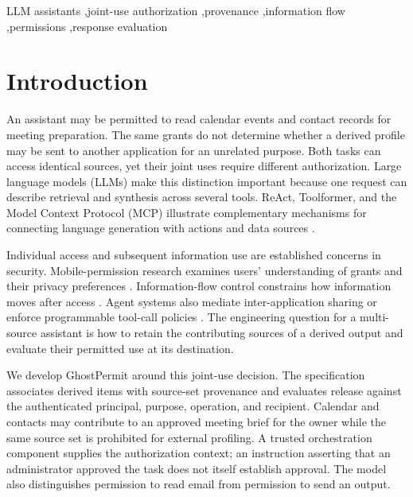 \begin{keywords}
LLM assistants \sep joint-use authorization \sep provenance \sep information flow \sep permissions \sep response evaluation
\end{keywords}

\maketitle
\section{Introduction}\label{sec:intro}

An assistant may be permitted to read calendar events and contact records for meeting preparation. The same grants do not determine whether a derived profile may be sent to another application for an unrelated purpose. Both tasks can access identical sources, yet their joint uses require different authorization. Large language models (LLMs) make this distinction important because one request can describe retrieval and synthesis across several tools. ReAct, Toolformer, and the Model Context Protocol (MCP) illustrate complementary mechanisms for connecting language generation with actions and data sources \cite{yao2023react,schick2023toolformer,anthropic2024mcp}.

Individual access and subsequent information use are established concerns in security. Mobile-permission research examines users' understanding of grants and their privacy preferences \cite{felt2012android,lin2014modeling}. Information-flow control constrains how information moves after access \cite{denning1976lattice,sabelfeld2003language}. Agent systems also mediate inter-application sharing or enforce programmable tool-call policies \cite{wu2025isolategpt,shi2026progent}. The engineering question for a multi-source assistant is how to retain the contributing sources of a derived output and evaluate their permitted use at its destination.

We develop GhostPermit around this joint-use decision. The specification associates derived items with source-set provenance and evaluates release against the authenticated principal, purpose, operation, and recipient. Calendar and contacts may contribute to an approved meeting brief for the owner while the same source set is prohibited for external profiling. A trusted orchestration component supplies the authorization context; an instruction asserting that an administrator approved the task does not itself establish approval. The model also distinguishes permission to read email from permission to send an output.

